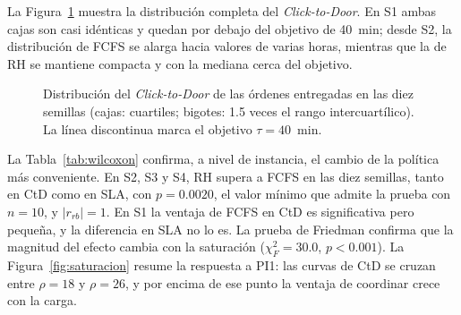 \documentclass[10pt]{article}
\renewcommand{\footnotesize}{\fontsize{9}{11}\selectfont}
\newcommand{\caja}[7]{%
  \draw (#1,#2) -- (#1,#3) (#1,#5) -- (#1,#6);
  \draw (#1-0.14,#2) -- (#1+0.14,#2) (#1-0.14,#6) -- (#1+0.14,#6);
  \filldraw[fill=#7!75, draw=black!70] (#1-0.3,#3) rectangle (#1+0.3,#5);
  \draw[line width=1pt] (#1-0.3,#4) -- (#1+0.3,#4);}
\begin{document}
La Figura~\ref{fig:boxplot} muestra la distribución completa del \textit{Click-to-Door}. En S1 ambas
cajas son casi idénticas y quedan por debajo del objetivo de 40~min; desde S2, la distribución de
FCFS se alarga hacia valores de varias horas, mientras que la de RH se mantiene compacta y con la
mediana cerca del objetivo.

\begin{figure}[htbp]
\centering
{}
\caption{Distribución del \textit{Click-to-Door} de las órdenes entregadas en las diez semillas
(cajas: cuartiles; bigotes: 1.5 veces el rango intercuartílico). La línea discontinua marca el
objetivo $\tau = 40$~min.}
\label{fig:boxplot}
\end{figure}

La Tabla~\ref{tab:wilcoxon} confirma, a nivel de instancia, el cambio de la política más conveniente. En S2, S3 y S4, RH
supera a FCFS en las diez semillas, tanto en CtD como en SLA, con $p = 0.0020$, el valor mínimo que
admite la prueba con $n = 10$, y $|r_{rb}| = 1$. En S1 la ventaja de FCFS en CtD es significativa
pero pequeña, y la diferencia en SLA no lo es. La prueba de Friedman confirma que la magnitud del
efecto cambia con la saturación ($\chi^2_F = 30.0$, $p < 0.001$). La Figura~\ref{fig:saturacion}
resume la respuesta a PI1: las curvas de CtD se cruzan entre $\rho = 18$ y $\rho = 26$, y por encima
de ese punto la ventaja de coordinar crece con la carga.
\end{document}
